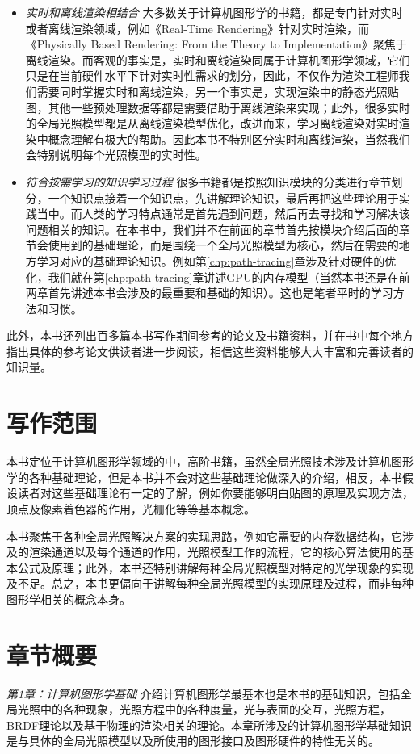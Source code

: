 \begin{itemize}
	\item \emph{实时和离线渲染相结合 } 大多数关于计算机图形学的书籍，都是专门针对实时或者离线渲染领域，例如《Real-Time Rendering》针对实时渲染，而《Physically Based Rendering: From the Theory to Implementation》聚焦于离线渲染。而客观的事实是，实时和离线渲染同属于计算机图形学领域，它们只是在当前硬件水平下针对实时性需求的划分，因此，不仅作为渲染工程师我们需要同时掌握实时和离线渲染，另一个事实是，实现渲染中的静态光照贴图，其他一些预处理数据等都是需要借助于离线渲染来实现；此外，很多实时的全局光照模型都是从离线渲染模型优化，改进而来，学习离线渲染对实时渲染中概念理解有极大的帮助。因此本书不特别区分实时和离线渲染，当然我们会特别说明每个光照模型的实时性。
	\item \emph{符合按需学习的知识学习过程 } 很多书籍都是按照知识模块的分类进行章节划分，一个知识点接着一个知识点，先讲解理论知识，最后再把这些理论用于实践当中。而人类的学习特点通常是首先遇到问题，然后再去寻找和学习解决该问题相关的知识。在本书中，我们并不在前面的章节首先按模块介绍后面的章节会使用到的基础理论，而是围绕一个全局光照模型为核心，然后在需要的地方学习对应的基础理论知识。例如第\ref{chp:path-tracing}章涉及针对硬件的优化，我们就在第\ref{chp:path-tracing}章讲述GPU的内存模型（当然本书还是在前两章首先讲述本书会涉及的最重要和基础的知识）。这也是笔者平时的学习方法和习惯。
\end{itemize}

此外，本书还列出百多篇本书写作期间参考的论文及书籍资料，并在书中每个地方指出具体的参考论文供读者进一步阅读，相信这些资料能够大大丰富和完善读者的知识量。



\section*{写作范围}
本书定位于计算机图形学领域的中，高阶书籍，虽然全局光照技术涉及计算机图形学的各种基础理论，但是本书并不会对这些基础理论做深入的介绍，相反，本书假设读者对这些基础理论有一定的了解，例如你要能够明白贴图的原理及实现方法，顶点及像素着色器的作用，光栅化等等基本概念。

本书聚焦于各种全局光照解决方案的实现思路，例如它需要的内存数据结构，它涉及的渲染通道以及每个通道的作用，光照模型工作的流程，它的核心算法使用的基本公式及原理；此外，本书还特别讲解每种全局光照模型对特定的光学现象的实现及不足。总之，本书更偏向于讲解每种全局光照模型的实现原理及过程，而非每种图形学相关的概念本身。




\section*{章节概要}
\emph{第1章：计算机图形学基础 } 介绍计算机图形学最基本也是本书的基础知识，包括全局光照中的各种现象，光照方程中的各种度量，光与表面的交互，光照方程，BRDF理论以及基于物理的渲染相关的理论。本章所涉及的计算机图形学基础知识是与具体的全局光照模型以及所使用的图形接口及图形硬件的特性无关的。

